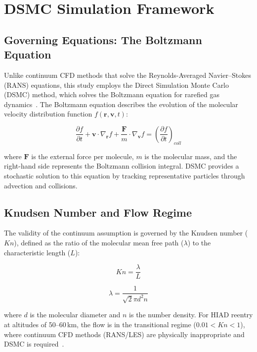 \section{DSMC Simulation Framework}

\subsection{Governing Equations: The Boltzmann Equation}
Unlike continuum CFD methods that solve the Reynolds-Averaged Navier--Stokes (RANS) equations, this study employs the Direct Simulation Monte Carlo (DSMC) method, which solves the Boltzmann equation for rarefied gas dynamics~\cite{bird1994molecular}. The Boltzmann equation describes the evolution of the molecular velocity distribution function $f(\mathbf{r}, \mathbf{v}, t)$:

\begin{equation}
    \frac{\partial f}{\partial t} + \mathbf{v} \cdot \nabla_{\mathbf{r}} f + \frac{\mathbf{F}}{m} \cdot \nabla_{\mathbf{v}} f = \left(\frac{\partial f}{\partial t}\right)_{coll}
\end{equation}

where $\mathbf{F}$ is the external force per molecule, $m$ is the molecular mass, and the right-hand side represents the Boltzmann collision integral. DSMC provides a stochastic solution to this equation by tracking representative particles through advection and collisions.

\subsection{Knudsen Number and Flow Regime}
The validity of the continuum assumption is governed by the Knudsen number ($Kn$), defined as the ratio of the molecular mean free path ($\lambda$) to the characteristic length ($L$):

\begin{equation}
    Kn = \frac{\lambda}{L}
\end{equation}

\begin{equation}
    \lambda = \frac{1}{\sqrt{2} \pi d^2 n}
\end{equation}

where $d$ is the molecular diameter and $n$ is the number density. For HIAD reentry at altitudes of 50--60\,km, the flow is in the transitional regime ($0.01 < Kn < 1$), where continuum CFD methods (RANS/LES) are physically inappropriate and DSMC is required~\cite{bird1994molecular}.

